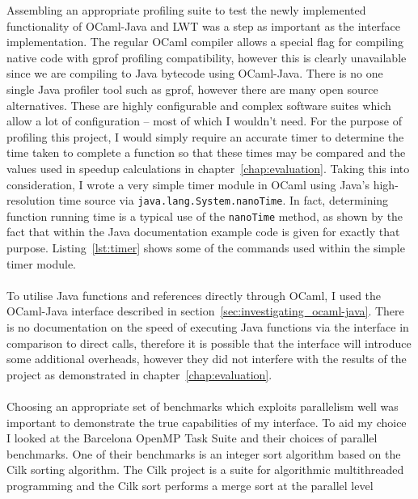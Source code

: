 \documentclass[12pt,twoside,notitlepage]{report}
\begin{document}
Assembling an appropriate profiling suite to test the newly implemented functionality of OCaml-Java and LWT was a step as important as the interface implementation. The regular OCaml compiler allows a special flag for compiling native code with gprof
profiling compatibility\cite{leroy2013}, however this is clearly unavailable since we are compiling to Java bytecode using OCaml-Java. There is no one single Java profiler tool such as gprof, however there are many open source
alternatives. These are highly configurable and complex software suites which allow a lot of configuration -- most of which I wouldn't need. For the purpose of profiling this project, I would simply require an accurate timer to
determine the time taken to complete a function so that these times may be compared and the values used in speedup calculations in chapter~\ref{chap:evaluation}. Taking this into consideration, I wrote a very simple timer module in
OCaml using Java's high-resolution time source via {\tt java.lang.System.nanoTime}. In fact, determining function running time is a typical use of the {\tt nanoTime} method, as shown by the fact that within the Java documentation example
code is given for exactly that purpose. Listing~\ref{lst:timer} shows some of the commands used within the simple timer module.
\hfill\\

\hfill\\
To utilise Java functions and references directly through OCaml, I used the OCaml-Java interface described in section~\ref{sec:investigating_ocaml-java}. There is no documentation on the speed of executing Java functions via the interface in
comparison to direct calls, therefore it is possible that the interface will introduce some additional overheads, however they did not interfere with the results of the project as demonstrated in chapter~\ref{chap:evaluation}.
\hfill\\
\hfill\\
%
%
Choosing an appropriate set of benchmarks which exploits parallelism well was important to demonstrate the true capabilities of my interface. To aid my choice I looked at the Barcelona OpenMP Task Suite and their choices of parallel
benchmarks. One of their benchmarks is an integer sort algorithm based on the Cilk sorting algorithm. The Cilk project is a suite for algorithmic multithreaded programming and the Cilk sort performs a merge sort at the parallel level
\end{document}
